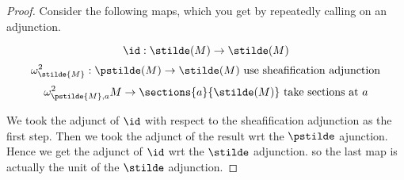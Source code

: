
\begin{proof}
Consider the following maps, which you get by repeatedly calling on an adjunction.

\[\id :\stilde(M) \rightarrow \stilde(M)\]
\[\omega^2_{\stilde{M}} : \pstilde(M) \rightarrow \stilde(M) 
	\mbox{ use sheafification adjunction}
\]
\[\omega^2_{\pstilde{M},a} M \rightarrow \sections{a}{\stilde(M)} \mbox{ take sections at $a$}\]

We took the adjunct of $\id$ with respect to the sheafification adjunction as the first step.
Then we took the adjunct of the result wrt the $\pstilde$ ajunction.
Hence we get the adjunct of $\id$ wrt the $\stilde$ adjunction.
so the last map is actually the unit of the $\stilde$ adjunction.
\end{proof}

